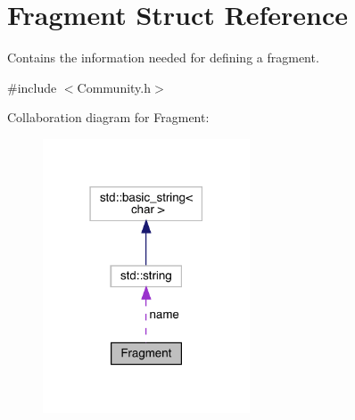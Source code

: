 \hypertarget{struct_fragment}{}\section{Fragment Struct Reference}
\label{struct_fragment}


Contains the information needed for defining a fragment.  




{\ttfamily \#include $<$Community.\+h$>$}



Collaboration diagram for Fragment\+:
\nopagebreak
\begin{figure}[H]
\begin{center}
\leavevmode
\includegraphics[width=174pt]{struct_fragment__coll__graph}
\end{center}
\end{figure}

